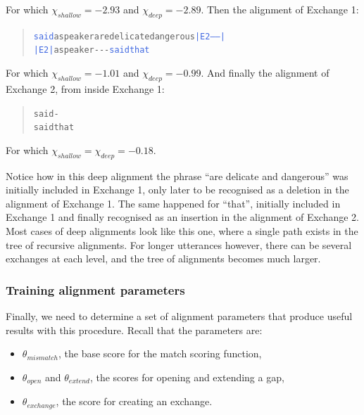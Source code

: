 \documentclass[a4paper,fleqn]{cas-dc}
\begin{document}
For which \(\chi_{shallow} = -2.93\) and \(\chi_{deep} = -2.89\). Then
the alignment of Exchange 1:

\begin{quote}\begin{alltt}\small
\textcolor{RoyalBlue}{said} a speaker \textcolor{BrickRed}{are delicate dangerous} \textcolor{RoyalBlue}{|E2-----|}
\textcolor{RoyalBlue}{|E2|} a speaker -   -        -         \textcolor{RoyalBlue}{said that}
\end{alltt}\end{quote}

For which \(\chi_{shallow} = -1.01\) and \(\chi_{deep} = -0.99\). And
finally the alignment of Exchange 2, from inside Exchange 1:

\begin{quote}\begin{alltt}\small
said -
said \textcolor{OliveGreen}{that}
\end{alltt}\end{quote}

For which \(\chi_{shallow} = \chi_{deep} = -0.18\).

Notice how in this deep alignment the phrase \enquote{are delicate and
dangerous} was initially included in Exchange 1, only later to be
recognised as a deletion in the alignment of Exchange 1. The same
happened for \enquote{that}, initially included in Exchange 1 and
finally recognised as an insertion in the alignment of Exchange 2. Most
cases of deep alignments look like this one, where a single path exists
in the tree of recursive alignments. For longer utterances however,
there can be several exchanges at each level, and the tree of alignments
becomes much larger.

\subsubsection{Training alignment
parameters}\label{training-alignment-parameters}

Finally, we need to determine a set of alignment parameters that produce
useful results with this procedure. Recall that the parameters are:

\begin{itemize}
\item
  \(\theta_{mismatch}\), the base score for the match scoring function,
\item
  \(\theta_{open}\) and \(\theta_{extend}\), the scores for opening and
  extending a gap,
\item
  \(\theta_{exchange}\), the score for creating an exchange.
\end{itemize}
\end{document}
